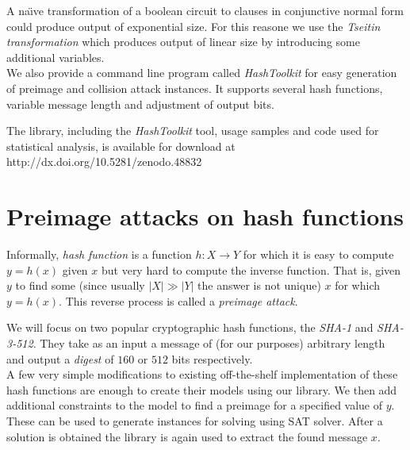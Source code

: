 \documentclass[myposter,portrait]{sciposter}
\def\mysection#1{
{\color{sectionCol}\section*{\sc\bfseries #1}}}
\begin{document}
\begin{multicols*}{3}
\begin{center}
  
\end{center}

A na\"{\i}ve transformation of a boolean circuit to clauses in conjunctive normal form could produce output of exponential size.
For this reasone we use the \emph{Tseitin transformation} \cite{tseitin1983complexity} which produces output of linear size by introducing some additional variables.
~\\

We also provide a command line program called \emph{HashToolkit} for easy generation of preimage and collision attack instances.
It supports several hash functions, variable message length and adjustment of output bits.
~\\

\vfill

\begin{minipage}[t][][b]{.59\columnwidth}
The library, including the \emph{HashToolkit} tool, usage samples and code used for statistical analysis, is available for download at http://dx.doi.org/10.5281/zenodo.48832
\end{minipage}
\begin{minipage}[t][][t]{.4\columnwidth}
\hfill {}
\end{minipage}

\columnbreak
\mysection{Preimage attacks on hash functions}
Informally, \emph{hash function} is a function $h: X \to Y$ for which it is easy to compute $y = h(x)$ given $x$ but very hard to compute the inverse function.
That is, given $y$ to find some (since usually $|X| \gg |Y|$ the answer is not unique) $x$ for which $y = h(x)$.
This reverse process is called a \emph{preimage attack}.

We will focus on two popular cryptographic hash functions, the \emph{SHA-1} and \emph{SHA-3-512}.
They take as an input a message of (for our purposes) arbitrary length and output a \emph{digest} of $160$ or $512$ bits respectively.
~\\

A few very simple modifications to existing off-the-shelf implementation of these hash functions are enough to create their models using our library.
We then add additional constraints to the model to find a preimage for a specified value of $y$.
These can be used to generate instances for solving using SAT solver.
After a solution is obtained the library is again used to extract the found message $x$.


\end{multicols*}
\end{document}
